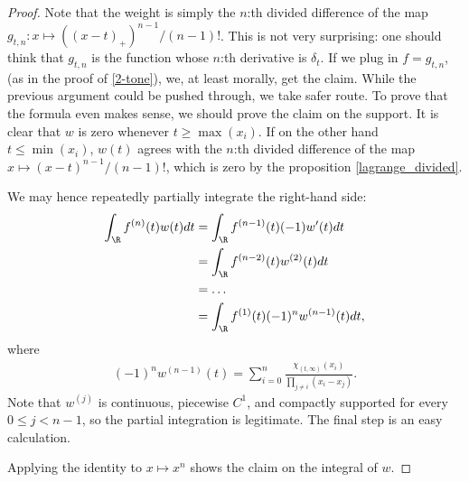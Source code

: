\begin{proof}
	Note that the weight is simply the $n$:th divided difference of the map $g_{t, n} : x \mapsto ((x - t)_{+})^{n - 1}/(n - 1)!$. This is not very surprising: one should think that $g_{t, n}$ is the function whose $n$:th derivative is $\delta_{t}$. If we plug in $f = g_{t, n}$, (as in the proof of \ref{2-tone}), we, at least morally, get the claim. While the previous argument could be pushed through, we take safer route. To prove that the formula even makes sense, we should prove the claim on the support. It is clear that $w$ is zero whenever $t \geq \max(x_{i})$. If on the other hand $t \leq \min(x_{i})$, $w(t)$ agrees with the $n$:th divided difference of the map $x \mapsto (x - t)^{n - 1}/(n - 1)!$, which is zero by the proposition \ref{lagrange_divided}.

	We may hence repeatedly partially integrate the right-hand side:
	\begin{align*}
		 \int_{\R} f^{(n)}(t) w(t) dt &= \int_{\R} f^{(n - 1)}(t) (-1) w'(t) dt \\
		 &= \int_{\R} f^{(n - 2)}(t) w^{(2)}(t) dt \\
		 &= \ldots \\
		 &= \int_{\R} f^{(1)}(t) (-1)^{n} w^{(n - 1)}(t) dt,
	\end{align*}
	where
	\begin{align*}
		(-1)^{n} w^{(n - 1)}(t) = \sum_{i = 0}^{n} \frac{\chi_{(t, \infty)}(x_{i})}{\prod_{j \neq i} (x_{i} - x_{j})}.
	\end{align*}
	Note that $w^{(j)}$ is continuous, piecewise $C^{1}$, and compactly supported for every $0 \leq j < n - 1$, so the partial integration is legitimate. The final step is an easy calculation.

	Applying the identity to $x \mapsto x^{n}$ shows the claim on the integral of $w$.


\end{proof}
